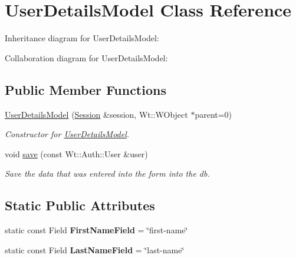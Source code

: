 \hypertarget{classUserDetailsModel}{}\section{User\+Details\+Model Class Reference}
\label{classUserDetailsModel}


Inheritance diagram for User\+Details\+Model\+:


Collaboration diagram for User\+Details\+Model\+:
\subsection*{Public Member Functions}
\begin{DoxyCompactItemize}
\item 
\hyperlink{classUserDetailsModel_aac16af78a18e4a99a6666d85914af5d5}{User\+Details\+Model} (\hyperlink{classSession}{Session} \&session, Wt\+::\+W\+Object $\ast$parent=0)
\begin{DoxyCompactList}\small\item\em Constructor for \hyperlink{classUserDetailsModel}{User\+Details\+Model}. \end{DoxyCompactList}\item 
void \hyperlink{classUserDetailsModel_a0216d9fc37c8528a5fd49756529d4f57}{save} (const Wt\+::\+Auth\+::\+User \&user)
\begin{DoxyCompactList}\small\item\em Save the data that was entered into the form into the db. \end{DoxyCompactList}\end{DoxyCompactItemize}
\subsection*{Static Public Attributes}
\begin{DoxyCompactItemize}
\item 
static const Field {\bfseries First\+Name\+Field} = \char`\"{}first-\/name\char`\"{}\hypertarget{classUserDetailsModel_a5106e62fceceff6333718c1c88cee6cf}{}\label{classUserDetailsModel_a5106e62fceceff6333718c1c88cee6cf}

\item 
static const Field {\bfseries Last\+Name\+Field} = \char`\"{}last-\/name\char`\"{}\hypertarget{classUserDetailsModel_a1d1e2d4300151876ed221b080860b004}{}\label{classUserDetailsModel_a1d1e2d4300151876ed221b080860b004}

\end{DoxyCompactItemize}
